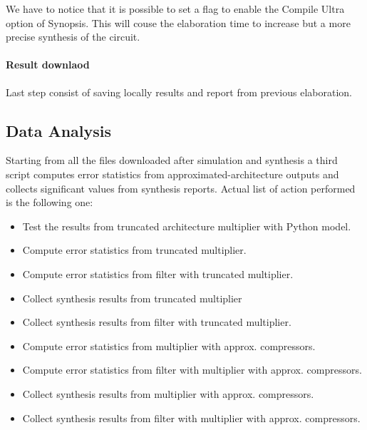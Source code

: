 \documentclass[a4paper]{article}
\begin{document}
	We have to notice that it is possible to set a flag to enable the Compile Ultra option of Synopsis. This will couse the elaboration time to increase but a more precise synthesis of the circuit.

	\paragraph{Result downlaod} Last step consist of saving locally results and report from previous elaboration.

	\subsection{Data Analysis}
	Starting from all the files downloaded after simulation and synthesis a third script computes error statistics from approximated-architecture outputs and collects significant values from synthesis reports.
	Actual list of action performed is the following one:

	\begin{itemize}
		\item Test the results from truncated architecture multiplier with Python model.
		\item Compute error statistics from truncated multiplier.
		\item Compute error statistics from filter with truncated multiplier.
		\item Collect synthesis results from truncated multiplier
		\item Collect synthesis results from filter with truncated multiplier.
    \item Compute error statistics from multiplier with approx. compressors.
    \item Compute error statistics from filter with multiplier with approx. compressors.
   	\item Collect synthesis results from multiplier with approx. compressors.
    \item Collect synthesis results from filter with multiplier with approx. compressors.
	\end{itemize}
\end{document}
